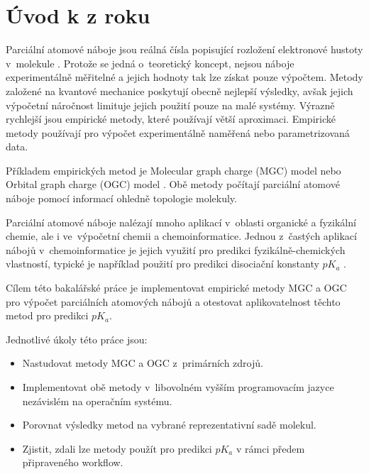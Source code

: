 \documentclass[12pt]{article}
\begin{document}
\section*{Úvod k  z roku \citeyear{Zouvala2018thesis} \cite{Zouvala2018thesis}}

Parciální atomové náboje jsou reálná čísla popisující rozložení elektronové hustoty v~molekule \cite{atkins2006atkins}. Protože se jedná o~teoretický koncept, nejsou náboje experimentálně měřitelné a jejich hodnoty tak lze získat pouze výpočtem. Metody založené na kvantové mechanice poskytují obecně nejlepší výsledky, avšak jejich výpočetní náročnost limituje jejich použití pouze na malé systémy. Výrazně rychlejší jsou empirické metody, které používají větší aproximaci. Empirické metody používají pro výpočet experimentálně naměřená nebo parametrizovaná data.

Příkladem empirických metod je Molecular graph charge (MGC) \cite{oliferenko2001novel} model nebo Orbital graph charge (OGC) model \cite{oliferenko2001novel}. Obě metody počítají parciální atomové náboje pomocí informací ohledně topologie molekuly. 

Parciální atomové náboje nalézají mnoho aplikací v~oblasti organické a fyzikální chemie, ale i ve~výpočetní chemii a chemoinformatice. Jednou z~častých aplikací nábojů v~chemoinformatice je jejich využití pro predikci fyzikálně-chemických vlastností, typické je například použití pro predikci disociační konstanty $pK_{a}$ \cite{vavrekova2013predicting, geidl2015does, geidl2015high}.

Cílem této bakalářské práce je implementovat empirické metody MGC a OGC pro výpočet parciálních atomových nábojů a otestovat aplikovatelnost těchto metod pro predikci $pK_{a}$.

Jednotlivé úkoly této práce jsou:
\begin{itemize}
\item Nastudovat metody MGC a OGC z~primárních zdrojů.
\item Implementovat obě metody v~libovolném vyšším programovacím jazyce nezávislém na operačním systému.
\item Porovnat výsledky metod na vybrané reprezentativní sadě molekul.
\item Zjistit, zdali lze metody použít pro predikci $pK_{a}$ v rámci předem připraveného workflow.
\end{itemize}
\end{document}
